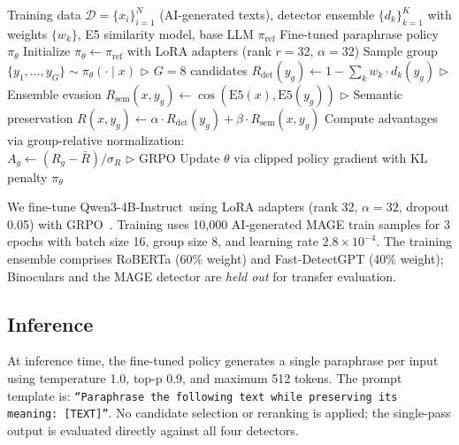 \documentclass[11pt]{article}
\begin{document}
\begin{algorithm}[t]
\caption{StealthRL Training}
\label{alg:stealthrl}
\begin{algorithmic}[1]
\REQUIRE Training data $\mathcal{D} = \{x_i\}_{i=1}^N$ (AI-generated texts), detector ensemble $\{d_k\}_{k=1}^K$ with weights $\{w_k\}$, E5 similarity model, base LLM $\pi_{\text{ref}}$
\ENSURE Fine-tuned paraphrase policy $\pi_\theta$
\STATE Initialize $\pi_\theta \leftarrow \pi_{\text{ref}}$ with LoRA adapters (rank $r{=}32$, $\alpha{=}32$)
      \STATE Sample group $\{y_1, \ldots, y_G\} \sim \pi_\theta(\cdot \mid x)$ \hfill $\triangleright$ $G{=}8$ candidates
        \STATE $R_{\text{det}}(y_g) \leftarrow 1 - \sum_{k} w_k \cdot d_k(y_g)$ \hfill $\triangleright$ Ensemble evasion
        \STATE $R_{\text{sem}}(x, y_g) \leftarrow \cos(\text{E5}(x), \text{E5}(y_g))$ \hfill $\triangleright$ Semantic preservation
        \STATE $R(x, y_g) \leftarrow \alpha \cdot R_{\text{det}}(y_g) + \beta \cdot R_{\text{sem}}(x, y_g)$
      \ENDFOR
      \STATE Compute advantages via group-relative normalization: \\ \quad $A_g \leftarrow (R_g - \bar{R}) / \sigma_R$ \hfill $\triangleright$ GRPO
    \ENDFOR
    \STATE Update $\theta$ via clipped policy gradient with KL penalty
  \ENDFOR
\ENDFOR
\RETURN $\pi_\theta$
\end{algorithmic}
\end{algorithm}

We fine-tune Qwen3-4B-Instruct~using LoRA adapters (rank 32, $\alpha = 32$, dropout 0.05) with GRPO~\cite{pang2025grpo}. Training uses 10,000 AI-generated MAGE train samples for 3 epochs with batch size 16, group size 8, and learning rate $2.8 \times 10^{-4}$. The training ensemble comprises RoBERTa (60\% weight) and Fast-DetectGPT (40\% weight); Binoculars and the MAGE detector are \emph{held out} for transfer evaluation.

\subsection{Inference}
\label{sec:inference}

At inference time, the fine-tuned policy generates a single paraphrase per input using temperature 1.0, top-p 0.9, and maximum 512 tokens. The prompt template is: \texttt{``Paraphrase the following text while preserving its meaning: [TEXT]''}. No candidate selection or reranking is applied; the single-pass output is evaluated directly against all four detectors.
\end{document}
